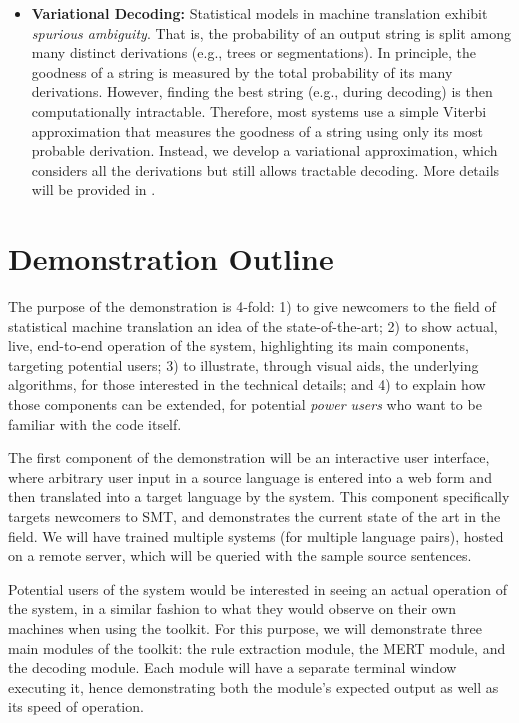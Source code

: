 \documentclass[11pt]{article}
\begin{document}
\begin{itemize}
\item \textbf{Variational Decoding:} Statistical models in machine translation exhibit \emph{spurious ambiguity}. That is, the probability of an output string is split among many distinct derivations (e.g., trees or segmentations).  In principle, the goodness of a string is measured by the total probability of its many derivations.  However, finding the best string (e.g., during decoding) is then computationally intractable. Therefore, most systems use a simple Viterbi approximation that measures the goodness of a string using only its most probable derivation.  Instead, we develop a variational approximation, which considers all the derivations but still allows tractable decoding.  More details will be provided in .
\end{itemize}

\section{Demonstration Outline}

The purpose of the demonstration is 4-fold: 1) to give newcomers to the field
of statistical machine translation an idea of the state-of-the-art; 2) to show
actual, live, end-to-end operation of the system,
highlighting its main components, targeting potential users; 3) to illustrate,
through visual aids, the underlying algorithms, for those interested in the
technical details; and 4) to explain how those components can be extended, for
potential \emph{power users} who want to be familiar with the code itself.

The first component of the demonstration will be an interactive user interface,
where arbitrary user input in a source language is entered into a web form and
then translated into a target language by the system.  This component
specifically targets newcomers to SMT, and demonstrates the current state of
the art in the field.  We will have trained multiple systems (for multiple
language pairs), hosted on a remote server, which will be queried with the
sample source sentences.

Potential users of the system would be interested in seeing an actual operation
of the system, in a similar fashion to what they would observe on their own
machines when using the toolkit.  For this purpose, we will demonstrate three
main modules of the toolkit: the rule extraction module, the MERT module, and
the decoding module.  Each module will have a separate terminal window
executing it, hence demonstrating both the module's expected output as well as
its speed of operation.
\end{document}
